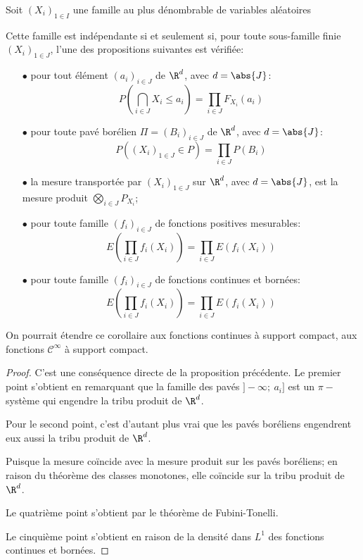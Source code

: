 \begin{cor}
\label{caracterisation_independance}
Soit $(X_i)_{1 \in I}$ une famille au plus dénombrable de variables aléatoires

Cette famille est indépendante si et seulement si, pour toute sous-famille finie $(X_i)_{1 \in J}$, l'une des propositions suivantes est vérifiée:
\begin{itemize}
\item[$\bullet$] 
pour tout élément $(a_i)_{i \in J}$ de $\R^d$, avec $d = \abs{J}$: 
\[P\left(\bigcap \limits_{i \in J} {X_i \leq a_i}\right)=\displaystyle{\prod \limits_{i \in J}} F_{X_i}(a_i)\]
\item[$\bullet$] 
pour toute pavé borélien $\Pi = \left(B_i\right)_{i \in J}$ de $\R^d$, avec $d = \abs{J}$:
\[
P\left((X_i)_{1 \in J} \in P\right) = \displaystyle{\prod \limits_{i \in J}} P(B_i)
\]
\item[$\bullet$] 
la mesure transportée par $(X_i)_{1 \in J}$ sur $\R^d$, avec $d = \abs{J}$, est la mesure produit $\bigotimes \limits_{i \in J} P_{X_i}$;
\item[$\bullet$] 
pour toute famille $\left(f_i\right)_{i \in J}$ de fonctions positives mesurables:
\[
E\left(\displaystyle{\prod \limits_{i \in J}} f_i(X_i)\right) = \displaystyle{\prod \limits_{i \in J}} E\left(f_i(X_i)\right)
\]
\item[$\bullet$] 
pour toute famille $\left(f_i\right)_{i \in J}$ de fonctions continues et bornées:
\[
E\left(\displaystyle{\prod \limits_{i \in J}} f_i(X_i)\right) = \displaystyle{\prod \limits_{i \in J}} E\left(f_i(X_i)\right)
\]
\end{itemize}
\end{cor}

On pourrait étendre ce corollaire aux fonctions continues à support compact, aux fonctions $\mathcal{C}^{\infty}$ à support compact.

\begin{proof}
C'est une conséquence directe de la proposition précédente. Le premier point s'obtient en remarquant que la famille des pavés $]-\infty;~a_i]$ est un $\pi-$système qui engendre la tribu produit de $\R^d$.

Pour le second point, c'est d'autant plus vrai que les pavés boréliens engendrent eux aussi la tribu produit de $\R^d$.

Puisque la mesure coïncide avec la mesure produit sur les pavés boréliens; en raison du théorème des classes monotones, elle coïncide sur la tribu produit de $\R^d$.

Le quatrième point s'obtient par le théorème de Fubini-Tonelli.

Le cinquième point s'obtient en raison de la densité dans $L^1$ des fonctions continues et bornées.
\end{proof}



